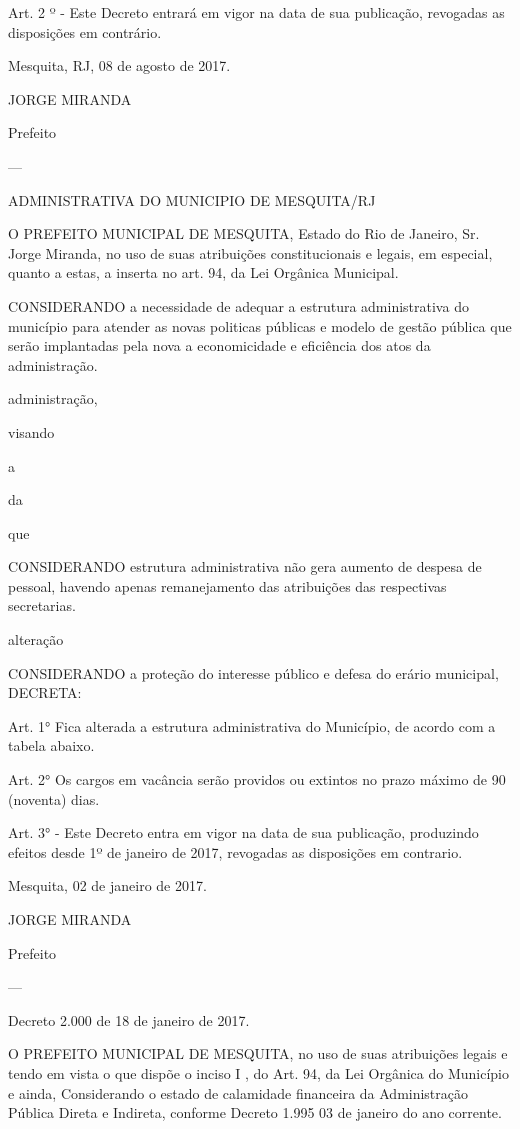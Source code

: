 \documentclass{doliberto}
\begin{document}
Art.  2  º  -  Este  Decreto  entrará  em  vigor  na  data  de  sua 
publicação, revogadas as disposições em contrário. 

 
Mesquita, RJ, 08 de agosto de 2017. 

 

JORGE MIRANDA 

Prefeito 

---

ADMINISTRATIVA DO MUNICIPIO DE MESQUITA/RJ 

O PREFEITO MUNICIPAL DE MESQUITA, Estado do Rio de 
Janeiro,  Sr.  Jorge  Miranda,  no  uso  de  suas  atribuições 
constitucionais  e  legais,  em  especial,  quanto  a  estas,  a 
inserta no art. 94, da Lei Orgânica Municipal. 

CONSIDERANDO  a  necessidade  de  adequar  a  estrutura 
administrativa  do  município  para  atender  as  novas 
politicas  públicas  e  modelo  de  gestão  pública  que  serão 
implantadas  pela  nova 
a 
economicidade e eficiência dos atos da administração.  

administração, 

visando 

a 

da 

que 

CONSIDERANDO 
estrutura 
administrativa  não  gera  aumento  de  despesa  de  pessoal, 
havendo  apenas  remanejamento  das  atribuições  das 
respectivas secretarias.  

alteração 

CONSIDERANDO  a  proteção  do  interesse  público  e  defesa 
do erário municipal, DECRETA:  

Art.  1°  Fica  alterada  a  estrutura  administrativa  do 
Município, de acordo com a tabela abaixo.  

Art. 2° Os cargos em vacância serão providos ou extintos no 
prazo máximo de 90 (noventa) dias.  

 

Art.  3°  -  Este  Decreto  entra  em  vigor  na  data  de  sua 
publicação, produzindo efeitos desde 1º de janeiro de 2017, 
revogadas as disposições em contrario. 

Mesquita, 02 de janeiro de 2017. 

JORGE MIRANDA  

Prefeito

---

Decreto 2.000 de 18 de janeiro de 2017. 

O  PREFEITO  MUNICIPAL  DE  MESQUITA,  no  uso  de  suas 
atribuições legais e tendo em vista o que dispõe o inciso I , 
do  Art.  94,  da  Lei  Orgânica  do  Município  e  ainda, 
Considerando  o  estado  de  calamidade 
financeira  da 
Administração Pública Direta e Indireta, conforme Decreto 
1.995 03 de janeiro do ano corrente. 
\end{document}
